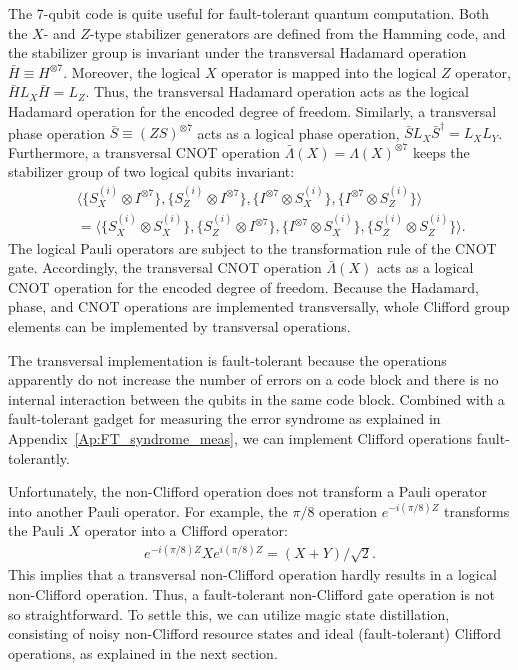 The 7-qubit code is quite useful for fault-tolerant quantum computation.
Both the $X$- and $Z$-type stabilizer generators are defined from the Hamming code, and the stabilizer group is invariant under the transversal Hadamard operation 
$\bar H \equiv H^{\otimes 7}$.
Moreover, the logical $X$ operator is mapped into the logical $Z$ operator, $\bar H L_X \bar H = L_Z$.
Thus, the transversal Hadamard operation acts as the logical Hadamard operation for the encoded degree of freedom.
Similarly, a transversal phase operation $\bar S \equiv (ZS)^{\otimes 7}$ acts as a logical phase operation, $\bar S L_X \bar S^{\dag} =  L_X L_Y$.
Furthermore, a transversal CNOT operation $\bar \Lambda (X) = \Lambda(X)^{\otimes 7}$ keeps the stabilizer group of two logical qubits invariant:
\begin{eqnarray}
&&\langle \{ S_X^{(i)} \otimes I^{\otimes 7} \},
\{ S_Z^{(i)} \otimes I^{\otimes 7} \} ,
\{  I^{\otimes 7} \otimes S_X^{(i)} \},
\{  I^{\otimes 7} \otimes S_Z^{(i)} \} \rangle
\\
&&=
\langle \{ S_X^{(i)} \otimes S_X^{(i)} \},
\{ S_Z^{(i)} \otimes I^{\otimes 7} \} ,
\{  I^{\otimes 7} \otimes S_X^{(i)} \},
\{  S_Z^{(i)} \otimes S_Z^{(i)} \} \rangle.
\end{eqnarray}
The logical Pauli operators are subject to the transformation rule of the CNOT gate.
Accordingly, the transversal CNOT operation $\bar \Lambda (X)$ acts as a logical CNOT operation for the encoded degree of freedom.
Because the Hadamard, phase, and CNOT operations are implemented transversally, whole Clifford group elements can be implemented by transversal operations.

The transversal implementation is fault-tolerant because the operations apparently do not increase the number of errors on a code block and there is no internal interaction between the qubits in the same code block.
Combined with a fault-tolerant gadget for measuring the error syndrome as explained in Appendix~\ref{Ap:FT_syndrome_meas}, we can implement Clifford operations fault-tolerantly.

Unfortunately, the non-Clifford operation does not transform a Pauli operator into another Pauli operator.
For example, the $\pi/8$ operation $e^{ -i (\pi /8) Z}$ transforms the Pauli $X$ operator into a Clifford operator:
\begin{eqnarray}
e^{-i (\pi/8) Z} X e^{i (\pi/8) Z} = (X+Y)/\sqrt{2}.
\end{eqnarray}
This implies that a transversal non-Clifford operation hardly results in a logical non-Clifford operation.
Thus, a fault-tolerant non-Clifford gate operation is not so straightforward.
To settle this, we can utilize magic state distillation, consisting of noisy non-Clifford resource states and ideal (fault-tolerant) Clifford operations, as explained in the next section.


